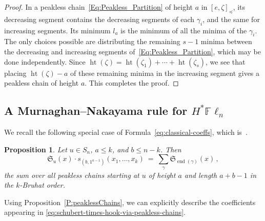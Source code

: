 \documentclass[12pt,oneside,reqno]{amsart}
\newtheorem{proposition}[theorem]{Proposition}
\theoremstyle{definition}
\numberwithin{equation}{section}
\newcommand{\Fln}{{\mathbb F}\ell_n}
\newcommand{\frakS}{{\mathfrak S}}
\DeclareMathOperator{\het}{ht}
\DeclareMathOperator{\nd}{end}
\begin{document}
\begin{proof}
In a peakless chain~\eqref{Eq:Peakless_Partition} of height $a$ in $[e,\zeta]_\preceq$, its decreasing segment contains
the decreasing segments of each $\gamma_i$, and the same for increasing segments.
Its minimum $l_a$ is the minimum of all the minima of the $\gamma_i$.
The only choices possible are distributing the remaining $s{-}1$ minima between the decreasing and increasing segments
of~\eqref{Eq:Peakless_Partition}, which may be done independently.
Since $\het(\zeta)=\het(\zeta_1)+\dotsb+\het(\zeta_s)$, we see that placing $\het(\zeta)-a$ of these remaining minima in
the increasing segment gives a peakless chain of height $a$.
This completes the proof.
\end{proof}





\subsection{A Murnaghan--Nakayama rule for $H^*\Fln$}

We recall the following special case of
Formula~\eqref{eq:classical-coeffs}, which is~\cite[Cor. 9]{So96}.

\begin{proposition}
    \label{pieri-formulas-version-2}
    Let $u \in S_n$,  $a\leq k$, and $b\leq n{-}k$. Then
    \begin{equation}
        \label{eq:schubert-times-hook-via-peakless-chains}
        \frakS_u(x)\cdot s_{(b,1^{a-1})}(x_1,\dotsc,x_k)\ =\ \sum_\gamma \frakS_{\nd(\gamma)}(x)\,,
    \end{equation}
    the sum over all peakless chains starting at $u$ of height $a$ and length $a{+}b{-}1$ in the $k$-Bruhat order.
\end{proposition}

Using Proposition~\ref{P:peaklessChains}, we can explicitly describe the coefficients
appearing in \eqref{eq:schubert-times-hook-via-peakless-chains}.
\end{document}
